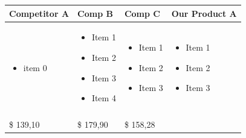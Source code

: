 \documentclass[11pt,titlepage]{article}
\begin{document}
\begin{tabular}{| m{92 pt} | m{92 pt} | m{92 pt} | m{92 pt} |}
  Competitor A & Comp B & Comp C & Our Product A\\\hline
  \begin{itemize} \tiny \item  item 0 \end{itemize} & 
  \begin{itemize} \tiny 
  \item Item 1
  \item Item 2
  \item Item 3
  \item Item 4\end{itemize} & 
    \begin{itemize} \tiny 
    \item Item 1
    \item Item 2
    \item Item 3\end{itemize}& 
      \begin{itemize} \tiny 
      \item Item 1
      \item Item 2
      \item Item 3 \end{itemize} \\
      & & & \\ \hline
      \$ 139,10 & \$ 179,90 & \$ 158,28 & \\ \hline
\end{tabular}
\end{document}
